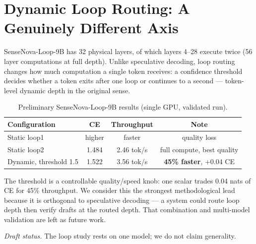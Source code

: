 \documentclass[11pt,a4paper]{article}
\begin{document}
\section{Dynamic Loop Routing: A Genuinely Different Axis}
SenseNova-Loop-9B has 32 physical layers, of which layers 4--28 execute twice (56 layer
computations at full depth). Unlike speculative decoding, loop routing changes how much
computation a single token receives: a confidence threshold decides whether a token exits
after one loop or continues to a second --- token-level dynamic depth in the original sense.
\begin{table}[h]
\centering
\begin{tabular}{lccc}
\toprule
Configuration & CE & Throughput & Note\\
\midrule
Static loop1 & higher & faster & quality loss\\
Static loop2 & 1.484 & 2.46 tok/s & full compute, best quality\\
Dynamic, threshold 1.5 & 1.522 & 3.56 tok/s & \textbf{45\% faster}, +0.04 CE\\
\bottomrule
\end{tabular}
\caption{Preliminary SenseNova-Loop-9B results (single GPU, validated run).}
\end{table}
The threshold is a controllable quality/speed knob: one scalar trades 0.04 nats of CE for
45\% throughput. We consider this the strongest methodological lead because it is orthogonal
to speculative decoding --- a system could route loop depth then verify drafts at the routed
depth. That combination and multi-model validation are left as future work.

\noindent\textit{Draft status.} The loop study rests on one model; we do not claim generality.
\end{document}

